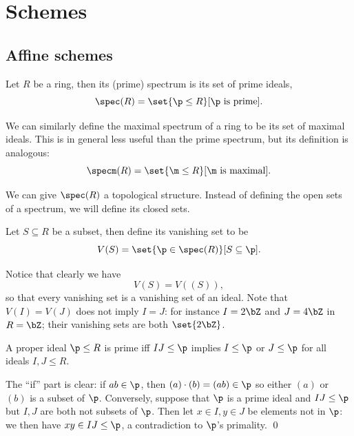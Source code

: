 \section{Schemes}

\subsection{Affine schemes}

\bdefn

    Let $R$ be a ring, then its {\emphcolor (prime) spectrum} is its set of prime ideals,
    $$ \spec(R) = \set{\p\leq R}[\hbox{$\p$ is prime}] . $$

\edefn

\bnote

    We can similarly define the {\emphcolor maximal spectrum} of a ring to be its set of maximal ideals.
    This is in general less useful than the prime spectrum, but its definition is analogous:
    $$ \specm(R) = \set{\m\leq R}[\hbox{$\m$ is maximal}] . $$

\enote

We can give $\spec(R)$ a topological structure.
Instead of defining the open sets of a spectrum, we will define its closed sets.

\bdefn

    Let $S\subseteq R$ be a subset, then define its {\emphcolor vanishing set} to be
    $$ V(S) = \set{\p\in\spec(R)}[S\subseteq\p] . $$

\edefn

Notice that clearly we have
$$ V(S) = V((S)) , $$
so that every vanishing set is a vanishing set of an ideal.
Note that $V(I)=V(J)$ does not imply $I=J$: for instance $I=2\bZ$ and $J=4\bZ$ in $R=\bZ$; their vanishing sets are both $\set{2\bZ}$.

\blemm

    A proper ideal $\p\leq R$ is prime iff $IJ\leq\p$ implies $I\leq\p$ or $J\leq\p$ for all ideals $I,J\leq R$.

\elemm

\bproof

    The ``if'' part is clear: if $ab\in\p$, then $(a)\cdot(b)=(ab)\in\p$ so either $(a)$ or $(b)$ is a subset of $\p$.
    Conversely, suppose that $\p$ is a prime ideal and $IJ\leq\p$ but $I,J$ are both not subsets of $\p$.
    Then let $x\in I,y\in J$ be elements not in $\p$: we then have $xy\in IJ\leq\p$, a contradiction to $\p$'s primality.
    \qed

\eproof

